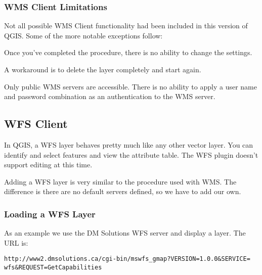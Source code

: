 \subsubsection{WMS Client Limitations}\label{sec:ogc-wms-limits}

Not all possible WMS Client functionality had been included in this version of QGIS.
Some of the more notable exceptions follow:


Once you've completed the 
procedure, there is no ability to change the settings.

A workaround is to delete the layer completely and start again.


Only public WMS servers are accessible.
There is no ability to apply a user name and password combination
as an authentication to the WMS server.

\subsection{WFS Client}

In QGIS, a WFS layer behaves pretty much like any other vector layer. You 
can identify and select features and view the attribute table. The WFS 
plugin doesn't support editing at this time. 

Adding a WFS layer is very similar to the procedure used with WMS. The
difference is there are no default servers defined, so we have to add our
own.

\subsubsection{Loading a WFS Layer}

As an example we use the DM Solutions WFS server and display a layer. The URL is:
\begin{verbatim}
http://www2.dmsolutions.ca/cgi-bin/mswfs_gmap?VERSION=1.0.0&SERVICE=
wfs&REQUEST=GetCapabilities
\end{verbatim}

